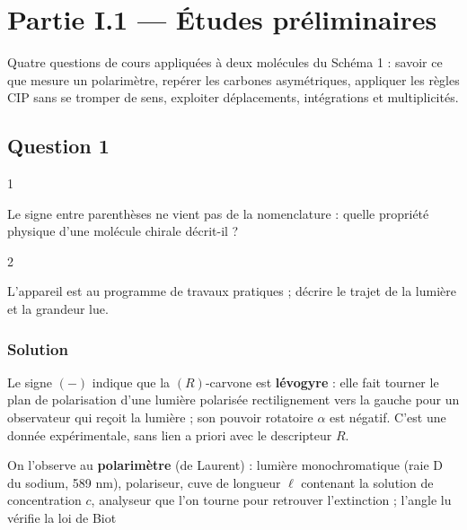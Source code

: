 \documentclass[11pt,a4paper]{article}
\newcommand{\equationajustee}[1]{%
  \sbox{\boiteequation}{$\displaystyle #1$}%
  \ifdim\wd\boiteequation>\linewidth
    \[\resizebox{\linewidth}{!}{\usebox{\boiteequation}}\]%
  \else
    \[#1\]%
  \fi}
\begin{document}
\hypertarget{partie-i.1-uxe9tudes-pruxe9liminaires}{%
\section{Partie I.1 --- Études préliminaires}\label{partie-i.1-uxe9tudes-pruxe9liminaires}}

Quatre questions de cours appliquées à deux molécules du Schéma 1 : savoir ce que mesure un polarimètre, repérer les carbones asymétriques, appliquer les règles CIP sans se tromper de sens, exploiter déplacements, intégrations et multiplicités.

\hypertarget{question-1}{%
\subsection{Question 1}\label{question-1}}

\begin{indication}{1}

Le signe entre parenthèses ne vient pas de la nomenclature : quelle propriété physique d'une molécule chirale décrit-il ?

\end{indication}

\begin{indication}{2}

L'appareil est au programme de travaux pratiques ; décrire le trajet de la lumière et la grandeur lue.

\end{indication}

\hypertarget{solution}{%
\subsubsection{Solution}\label{solution}}

Le signe \((-)\) indique que la \((R)\)-carvone est \textbf{lévogyre} : elle fait tourner le plan de polarisation d'une lumière polarisée rectilignement vers la gauche pour un observateur qui reçoit la lumière ; son pouvoir rotatoire \(\alpha\) est négatif. C'est une donnée expérimentale, sans lien a priori avec le descripteur \(R\).

On l'observe au \textbf{polarimètre} (de Laurent) : lumière monochromatique (raie D du sodium, 589 nm), polariseur, cuve de longueur \(\ell\) contenant la solution de concentration \(c\), analyseur que l'on tourne pour retrouver l'extinction ; l'angle lu vérifie la loi de Biot

\equationajustee{\alpha=[\alpha]_\lambda^T\,\ell\,c,\qquad\alpha<0 .}
\end{document}
